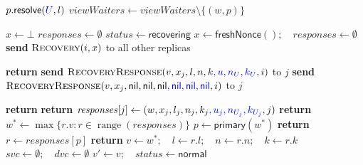 \begin{algorithm}[!tb]
\begin{algorithmic}[1]
          \State $p.\mathsf{resolve}(\textcolor{blue}{U},l)$
          \State $\mathit{viewWaiters}\gets\mathit{viewWaiters}\setminus\{(w,p)\}$
        \EndIf
      \EndFor
    \EndProcedure
  \end{algorithmic}
\end{algorithm}

\begin{algorithm}[!tb]
  \caption{Viewstamped Replication: Recovery After a Crash}
  \label{vr-recovery}
  \begin{algorithmic}[1]
    \State $x\gets\bot$
    \State $\mathit{responses}\gets\emptyset$
      \State $\mathit{status}\gets\mathsf{recovering}$
      \State $x\gets\mathsf{freshNonce}();\quad\mathit{responses}\gets\emptyset$
      \State \textbf{send} $\textsc{Recovery}(i,x)$ to all other replicas
    \EndProcedure

        \State \textbf{return}
      \EndIf
        \State \textbf{send} $\textsc{RecoveryResponse}(v,x_j,l,n,k\textcolor{blue}{,u,n_U,k_U},i)$ to $j$
      \Else
        \State \textbf{send} $\textsc{RecoveryResponse}(v,x_j,\mathsf{nil},\mathsf{nil},\mathsf{nil}
          \textcolor{blue}{,\mathsf{nil},\mathsf{nil},\mathsf{nil}},i)$ to $j$
      \EndIf
    \EndProcedure

        \State \textbf{return}
      \EndIf
        \State \textbf{return} 
      \EndIf
      \State $\mathit{responses}[j]\gets(w,x_j,l_j,n_j,k_j\textcolor{blue}{,u_j,n_{U_j},k_{U_j}},j)$
        \State \textbf{return}
      \EndIf
      \State $w^*\gets\max\{r.v:r\in\operatorname{range}(\mathit{responses})\}$
      \State $p\gets\mathsf{primary}(w^*)$
        \State \textbf{return}
      \EndIf
      \State $r\gets\mathit{responses}[p]$
        \State \textbf{return}
      \EndIf
      \State $v\gets w^*;\quad l\gets r.l;\quad n\gets r.n;\quad k\gets r.k$
      \State {}
      \State {}
      \State $\mathit{svc}\gets\emptyset;\quad\mathit{dvc}\gets\emptyset$
      \State $v'\gets v;\quad\mathit{status}\gets\mathsf{normal}$
    \EndProcedure
  \end{algorithmic}
\end{algorithm}
